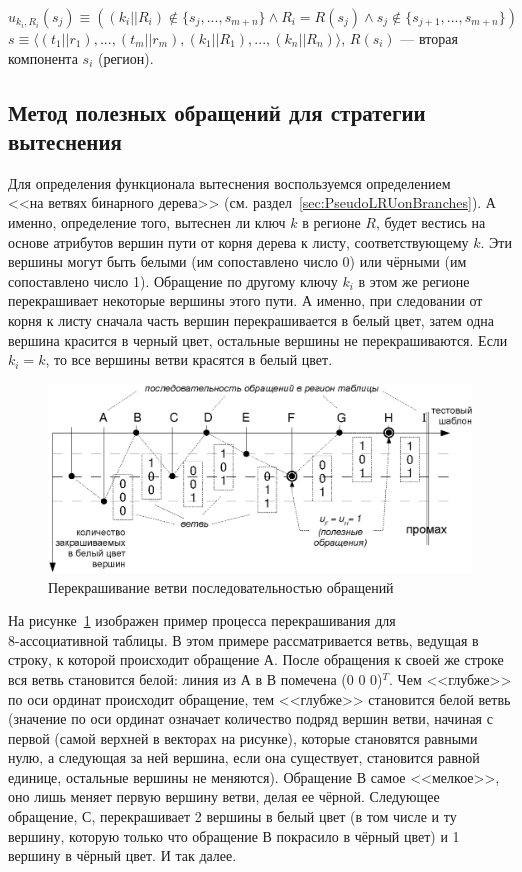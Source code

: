 \begin{enumerate}
$$u_{k_i,R_i}(s_j) \equiv ((k_i||R_i) \notin \{s_j, ..., s_{m+n}\} \wedge R_i = R(s_j) \wedge s_j \notin\{s_{j+1},..., s_{m+n}\})$$
$s \equiv \langle (t_1||r_1), ..., (t_m||r_m), (k_1||R_1), ..., (k_n||R_n)\rangle$, $R(s_i)$ --- вторая компонента $s_i$ (регион).


\subsection{Метод полезных обращений для стратегии вытеснения \PseudoLRU}

Для определения функционала вытеснения воспользуемся определением\\\PseudoLRU <<на ветвях бинарного дерева>> (см. раздел~\ref{sec:PseudoLRUonBranches}). А именно, определение того, вытеснен ли ключ $k$ в регионе $R$, будет вестись на основе атрибутов вершин пути от корня дерева к  листу, соответствующему $k$. Эти вершины могут быть белыми (им сопоставлено число 0) или чёрными (им сопоставлено число 1). Обращение по другому ключу $k_i$ в этом же регионе перекрашивает некоторые вершины этого пути. А именно, при следовании от корня к листу сначала часть вершин перекрашивается в белый цвет, затем одна вершина красится в черный цвет, остальные вершины не перекрашиваются. Если $k_i = k$, то все вершины ветви красятся в белый цвет.

  \begin{figure}[h] \center
  \includegraphics[width=\textwidth]{2.theor/plru_usefl_exmp}
  \caption{Перекрашивание ветви последовательностью обращений}\label{fig:plru_exmp_vytesn}
  \end{figure}

На рисунке~\ref{fig:plru_exmp_vytesn} изображен пример процесса перекрашивания для \\8-ассоциативной таблицы. В этом примере рассматривается ветвь, ведущая в строку, к которой происходит обращение А. После обращения к своей же строке вся ветвь становится белой: линия из А в В помечена (0 0 0)$^T$. Чем <<глубже>> по оси ординат происходит обращение, тем <<глубже>> становится белой ветвь (значение по оси ординат означает количество подряд вершин ветви, начиная с первой (самой верхней в векторах на рисунке), которые становятся равными нулю, а следующая за ней вершина, если она существует, становится равной единице, остальные вершины не меняются). Обращение В самое <<мелкое>>, оно лишь меняет первую вершину ветви, делая ее чёрной. Следующее обращение, С, перекрашивает 2 вершины в белый цвет (в том числе и ту вершину, которую только что обращение В покрасило в чёрный цвет) и 1 вершину в чёрный цвет. И так далее.


\end{enumerate}
